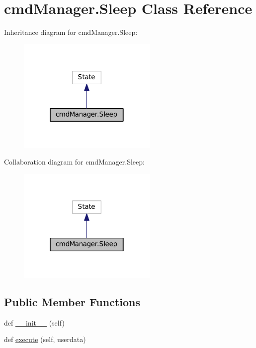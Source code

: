 \hypertarget{classcmdManager_1_1Sleep}{}\section{cmd\+Manager.\+Sleep Class Reference}
\label{classcmdManager_1_1Sleep}


Inheritance diagram for cmd\+Manager.\+Sleep\+:
\nopagebreak
\begin{figure}[H]
\begin{center}
\leavevmode
\includegraphics[width=190pt]{classcmdManager_1_1Sleep__inherit__graph}
\end{center}
\end{figure}


Collaboration diagram for cmd\+Manager.\+Sleep\+:
\nopagebreak
\begin{figure}[H]
\begin{center}
\leavevmode
\includegraphics[width=190pt]{classcmdManager_1_1Sleep__coll__graph}
\end{center}
\end{figure}
\subsection*{Public Member Functions}
\begin{DoxyCompactItemize}
\item 
def \hyperlink{classcmdManager_1_1Sleep_ad60663dd525a5d09fc4b558d452aa2b3}{\+\_\+\+\_\+init\+\_\+\+\_\+} (self)
\item 
def \hyperlink{classcmdManager_1_1Sleep_a071852b6496ea38cff32c00186ebc0f6}{execute} (self, userdata)
\end{DoxyCompactItemize}
